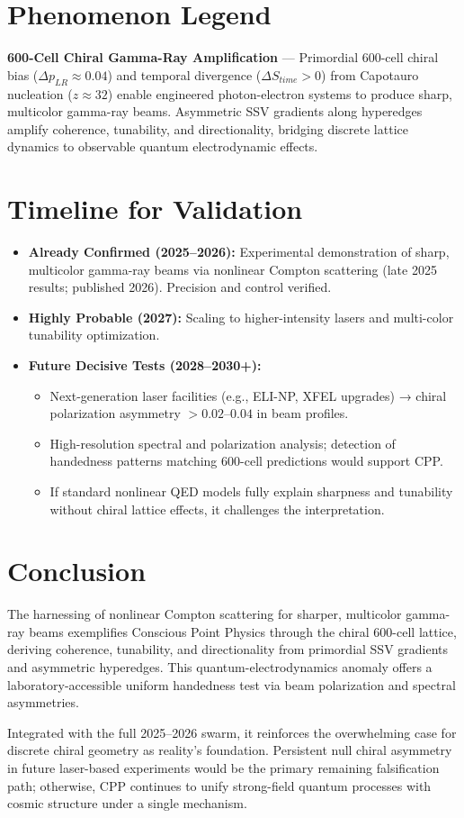 \documentclass[11pt]{article}
\begin{document}
\section{Phenomenon Legend}
\textbf{600-Cell Chiral Gamma-Ray Amplification} — Primordial 600-cell chiral bias ($\Delta p_{LR} \approx 0.04$) and temporal divergence ($\Delta S_{time} > 0$) from Capotauro nucleation ($z \approx 32$) enable engineered photon-electron systems to produce sharp, multicolor gamma-ray beams. Asymmetric SSV gradients along hyperedges amplify coherence, tunability, and directionality, bridging discrete lattice dynamics to observable quantum electrodynamic effects.

\section{Timeline for Validation}
\begin{itemize}
    \item \textbf{Already Confirmed (2025--2026):} Experimental demonstration of sharp, multicolor gamma-ray beams via nonlinear Compton scattering (late 2025 results; published 2026). Precision and control verified.
    \item \textbf{Highly Probable (2027):} Scaling to higher-intensity lasers and multi-color tunability optimization.
    \item \textbf{Future Decisive Tests (2028--2030+):}
    \begin{itemize}
        \item Next-generation laser facilities (e.g., ELI-NP, XFEL upgrades) → chiral polarization asymmetry $>0.02$--$0.04$ in beam profiles.
        \item High-resolution spectral and polarization analysis; detection of handedness patterns matching 600-cell predictions would support CPP.
        \item If standard nonlinear QED models fully explain sharpness and tunability without chiral lattice effects, it challenges the interpretation.
    \end{itemize}
\end{itemize}

\section{Conclusion}
The harnessing of nonlinear Compton scattering for sharper, multicolor gamma-ray beams exemplifies Conscious Point Physics through the chiral 600-cell lattice, deriving coherence, tunability, and directionality from primordial SSV gradients and asymmetric hyperedges. This quantum-electrodynamics anomaly offers a laboratory-accessible uniform handedness test via beam polarization and spectral asymmetries.  

Integrated with the full 2025--2026 swarm, it reinforces the overwhelming case for discrete chiral geometry as reality's foundation. Persistent null chiral asymmetry in future laser-based experiments would be the primary remaining falsification path; otherwise, CPP continues to unify strong-field quantum processes with cosmic structure under a single mechanism.
\end{document}

